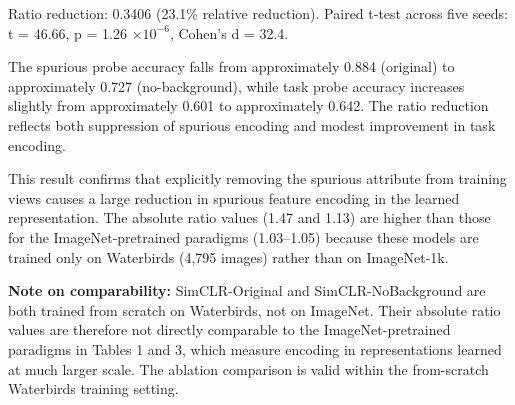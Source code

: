 Ratio reduction: 0.3406 (23.1\% relative reduction). Paired t-test across five seeds: t = 46.66, p = 1.26 $\times 10^{-6}$, Cohen's d = 32.4.

The spurious probe accuracy falls from approximately 0.884 (original) to approximately 0.727 (no-background), while task probe accuracy increases slightly from approximately 0.601 to approximately 0.642. The ratio reduction reflects both suppression of spurious encoding and modest improvement in task encoding.

This result confirms that explicitly removing the spurious attribute from training views causes a large reduction in spurious feature encoding in the learned representation. The absolute ratio values (1.47 and 1.13) are higher than those for the ImageNet-pretrained paradigms (1.03--1.05) because these models are trained only on Waterbirds (4,795 images) rather than on ImageNet-1k.

\textbf{Note on comparability:} SimCLR-Original and SimCLR-NoBackground are both trained from scratch on Waterbirds, not on ImageNet. Their absolute ratio values are therefore not directly comparable to the ImageNet-pretrained paradigms in Tables 1 and 3, which measure encoding in representations learned at much larger scale. The ablation comparison is valid within the from-scratch Waterbirds training setting.

